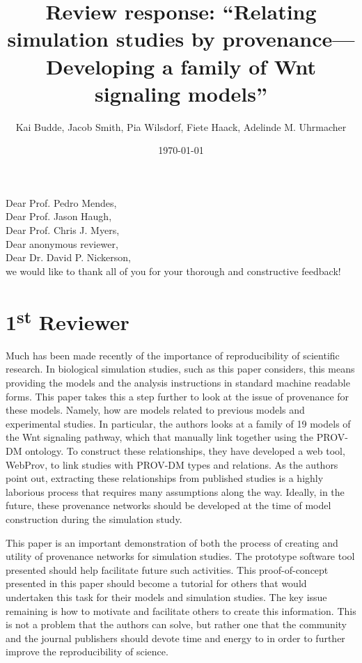 \documentclass{article}
\title{Review response: \enquote{Relating simulation studies by provenance---Developing a family of Wnt signaling models}}
\author{Kai Budde, Jacob Smith, Pia Wilsdorf, Fiete Haack, Adelinde M. Uhrmacher}
\date{\today}
\begin{document}
\maketitle

\noindent Dear Prof. Pedro Mendes,\\
Dear Prof. Jason Haugh,\\
Dear Prof. Chris J. Myers,\\
Dear anonymous reviewer,\\
Dear Dr. David P. Nickerson,\\

\noindent we would like to thank all of you for your thorough and constructive feedback!


\section*{1\textsuperscript{st} Reviewer}

\begin{mdframed}
Much has been made recently of the importance of reproducibility of scientific research.
In biological simulation studies, such as this paper considers, this means providing the models and the analysis instructions in standard machine readable forms.
This paper takes this a step further to look at the issue of provenance for these models.
Namely, how are models related to previous models and experimental studies.
In particular, the authors looks at a family of 19 models of the Wnt signaling pathway, which that manually link together using the PROV-DM ontology.
To construct these relationships, they have developed a web tool, WebProv, to link studies with PROV-DM types and relations.
As the authors point out, extracting these relationships from published studies is a highly laborious process that requires many assumptions along the way.
Ideally, in the future, these provenance networks should be developed at the time of model construction during the simulation study.

This paper is an important demonstration of both the process of creating and utility of provenance networks for simulation studies.
The prototype software tool presented should help facilitate future such activities.
This proof-of-concept presented in this paper should become a tutorial for others that would undertaken this task for their models and simulation studies.
The key issue remaining is how to motivate and facilitate others to create this information.
This is not a problem that the authors can solve, but rather one that the community and the journal publishers should devote time and energy to in order to further improve the reproducibility of science.
\end{mdframed}
\end{document}
